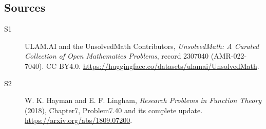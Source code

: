 \documentclass[11pt]{article}
\begin{document}
\subsection{Sources}
\begin{description}
\item[\hypertarget{source:2307040:1}{S1}] ULAM.AI and the UnsolvedMath Contributors, \emph{UnsolvedMath: A Curated Collection of Open Mathematics Problems}, record 2307040 (AMR-022-7040). CC BY4.0. \url{https://huggingface.co/datasets/ulamai/UnsolvedMath}.
\item[\hypertarget{source:2307040:2}{S2}] W. K. Hayman and E. F. Lingham, \emph{Research Problems in Function Theory} (2018), Chapter7, Problem7.40 and its complete update. \url{https://arxiv.org/abs/1809.07200}.
\end{description}
\label{end:2307040}
\end{document}
